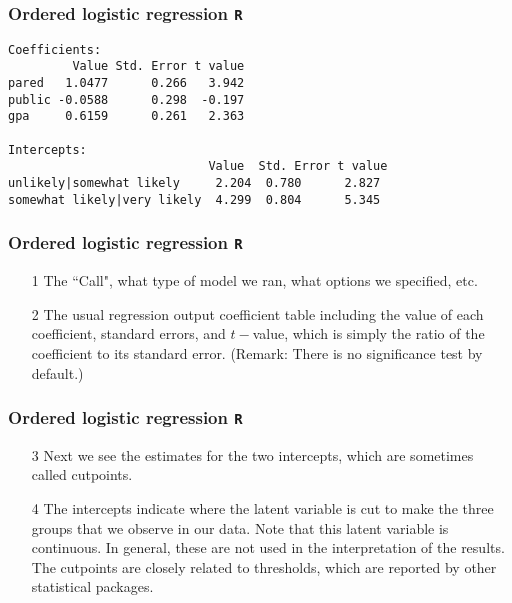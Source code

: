 \documentclass[00-GLMregslides.tex]{subfiles}
\begin{document}
\begin{frame}[fragile]
	\frametitle{Ordered logistic regression \texttt{R} }
	\large
\begin{framed}		
	\begin{verbatim}
Coefficients:
         Value Std. Error t value
pared   1.0477      0.266   3.942
public -0.0588      0.298  -0.197
gpa     0.6159      0.261   2.363

Intercepts:
                            Value  Std. Error t value
unlikely|somewhat likely     2.204  0.780      2.827 
somewhat likely|very likely  4.299  0.804      5.345 

\end{verbatim}
\end{framed}
 
\end{frame}
\begin{frame}[fragile]
	\frametitle{Ordered logistic regression \texttt{R} }
	\Large
\begin{itemize}
\item[1] The ``Call", what type of model we ran, what options we specified, etc.
\item[2] The usual regression output coefficient table including the value of each coefficient, standard errors, and 
$t-$value, which is simply the ratio of the coefficient to its standard error. (Remark: There is no significance test by default.)
\end{itemize}
\end{frame}
\begin{frame}[fragile]
	\frametitle{Ordered logistic regression \texttt{R} }
	\Large
\begin{itemize}
\item[3]	
Next we see the estimates for the two intercepts, which are sometimes called cutpoints. 
\item[4] The intercepts indicate where the latent variable is cut to make the three groups that we observe in our data. 
Note that this latent variable is continuous. In general, these are not used in the interpretation of the results. The cutpoints are closely related to thresholds, which are reported by other statistical packages.
\end{itemize}
\end{frame}
\end{document}
